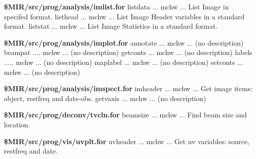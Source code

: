 \par{\bf \$MIR/src/prog/analysis/imlist.for}
{\eightpoint\begintt
listdata ... mchw ... List Image in specifed format.
listhead ... mchw ... List Image Header variables in a standard format.
liststat ... mchw ... List Image Statistics in a standard format.
\endtt}

\par{\bf \$MIR/src/prog/analysis/implot.for}
{\eightpoint\begintt
annotate ... mchw ... (no description)
beampat .... mchw ... (no description)
getconts ... mchw ... (no description)
labels ..... mchw ... (no description)
maplabel ... mchw ... (no description)
setconts ... mchw ... (no description)
\endtt}

\par{\bf \$MIR/src/prog/analysis/imspect.for}
{\eightpoint\begintt
imheader ... mchw ... Get image items: object, restfreq and date-obs.
getvaxis ... mchw ... (no description)
\endtt}

\par{\bf \$MIR/src/prog/deconv/tvcln.for}
{\eightpoint\begintt
beamsize ... mchw ... Find beam size and location.
\endtt}

\par{\bf \$MIR/src/prog/vis/uvplt.for}
{\eightpoint\begintt
uvheader ... mchw ... Get uv variables: source, restfreq and date.
\endtt}
